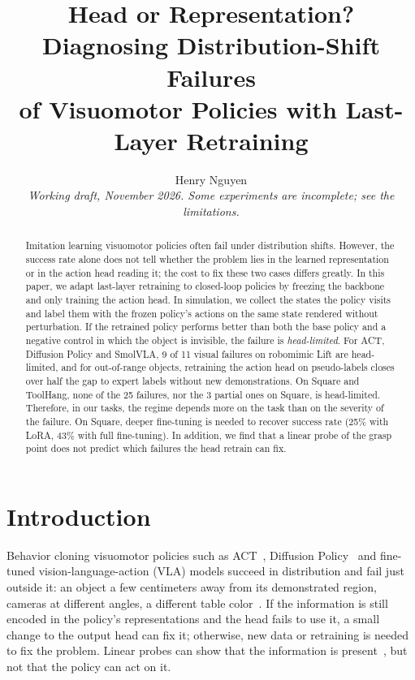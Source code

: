 \documentclass[10pt]{article}
\title{Head or Representation? Diagnosing Distribution-Shift Failures\\of Visuomotor Policies with Last-Layer Retraining}
\author{Henry Nguyen\\[2pt]{\small\itshape Working draft, November 2026. Some experiments are incomplete; see the limitations.}}
\date{\vspace{-6ex}}
\begin{document}
\maketitle

\begin{abstract}
Imitation learning visuomotor policies often fail under distribution shifts. However, the success rate
alone does not tell whether the problem lies in the learned representation or in the action head reading
it; the cost to fix these two cases differs greatly. In this paper, we adapt last-layer retraining to
closed-loop policies by freezing the backbone and only training the action head. In simulation, we collect
the states the policy visits and label them with the frozen policy's actions on the same state rendered
without perturbation. If the retrained policy performs better than both the base policy and a negative
control in which the object is invisible, the failure is \emph{head-limited}. For ACT, Diffusion Policy
and SmolVLA, 9 of 11 visual failures on robomimic Lift are head-limited, and for out-of-range objects,
retraining the action head on pseudo-labels closes over half the gap to expert labels without new demonstrations. On Square and ToolHang,
none of the 25 failures, nor the 3 partial ones on Square, is head-limited. Therefore, in our tasks, the
regime depends more on the task than on the severity of the failure. On Square, deeper fine-tuning is
needed to recover success rate (25\% with LoRA, 43\% with full fine-tuning). In addition, we find that a
linear probe of the grasp point does not predict which failures the head retrain can fix.
\end{abstract}

\section{Introduction}
\label{sec:intro}
Behavior cloning visuomotor policies such as ACT~\citep{zhao2023act}, Diffusion
Policy~\citep{chi2023diffusion} and fine-tuned vision-language-action (VLA) models succeed in
distribution and fail just outside it: an object a few centimeters away from its demonstrated region,
cameras at different angles, a different table color~\citep{xie2024decomposing,xue2025demogen,zhou2025liberopro}.
If the information is still encoded in the policy's representations and the head fails to use it, a
small change to the output head can fix it; otherwise, new data or retraining is needed to fix the
problem. Linear probes can show that the information is present~\citep{lu2025probing,zhang2026probeact},
but not that the policy can act on it.
\end{document}
